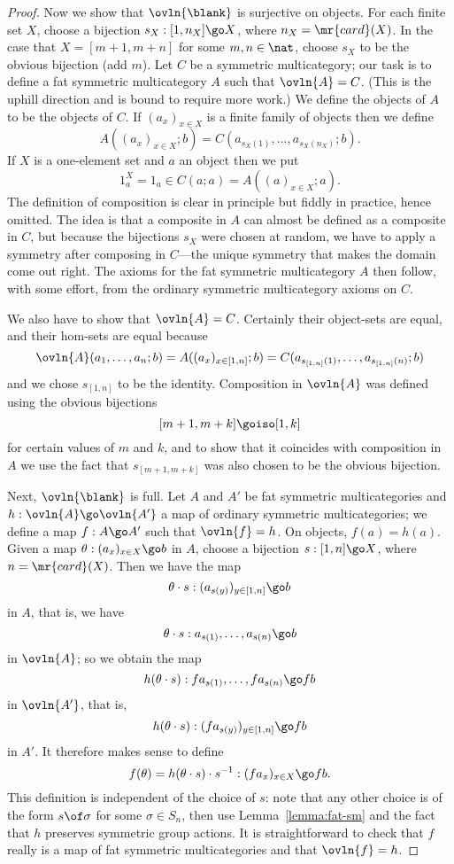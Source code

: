 \begin{proof}
Now we show that $\ovln{\blank}$ is surjective on objects.  For each finite
set $X$, choose a bijection $s_X: [1,n_X] \go X$, where $n_X =
\mr{card}(X)$.  In the case that $X=[m+1,m+n]$ for some $m,n\in\nat$,
choose $s_X$ to be the obvious bijection (add $m$).  Let $C$ be a symmetric
multicategory; our task is to define a fat symmetric multicategory $A$ such
that $\ovln{A} = C$.  (This is the uphill direction and is bound to require
more work.)  We define the objects of $A$ to be the objects of $C$.  If
$(a_x)_{x\in X}$ is a finite family of objects then we define
\[
A((a_x)_{x\in X}; b)
=
C(a_{s_X(1)}, \ldots, a_{s_X(n_X)}; b).
\]
If $X$ is a one-element set and $a$ an object then we put
\[
1_a^X = 1_a \in C(a;a) = A((a)_{x\in X}; a).
\]
The definition of composition is clear in principle but fiddly in practice,
hence omitted.  The idea is that a composite in $A$ can almost be defined
as a composite in $C$, but because the bijections $s_X$ were chosen at
random, we have to apply a symmetry after composing in $C$---the unique
symmetry that makes the domain come out right.  The axioms for the fat
symmetric multicategory $A$ then follow, with some effort, from the
ordinary symmetric multicategory axioms on $C$.

We also have to show that $\ovln{A} = C$.  Certainly their object-sets are
equal, and their hom-sets are equal because
\[
\ovln{A}(a_1, \ldots, a_n; b)
=
A((a_x)_{x\in [1,n]}; b)
=
C(a_{s_{[1,n]}(1)}, \ldots, a_{s_{[1,n]}(n)}; b)
\]
and we chose $s_{[1,n]}$ to be the identity.  Composition in $\ovln{A}$ was
defined using the obvious bijections
\[
[m+1, m+k] \goiso [1,k]
\]
for certain values of $m$ and $k$, and to show that it coincides with
composition in $A$ we use the fact that $s_{[m+1,m+k]}$ was also chosen to
be the obvious bijection.

Next, $\ovln{\blank}$ is full.  Let $A$ and $A'$ be fat symmetric
multicategories and $h: \ovln{A} \go \ovln{A'}$ a map of ordinary symmetric
multicategories; we define a map $f: A \go A'$ such that $\ovln{f} = h$.
On objects, $f(a) = h(a)$.  Given a map 
$
\theta: (a_x)_{x\in X} \go b
$
in $A$, choose a bijection $s: [1,n] \go X$, where $n=\mr{card}(X)$.  Then
we have the map
\[
\theta\cdot s: (a_{s(y)})_{y\in [1,n]} \go b
\]
in $A$, that is, we have 
\[
\theta\cdot s: a_{s(1)}, \ldots, a_{s(n)} \go b
\]
in $\ovln{A}$; so we obtain the map
\[
h(\theta\cdot s): fa_{s(1)}, \ldots, fa_{s(n)} \go fb
\]
in $\ovln{A'}$, that is, 
\[
h(\theta\cdot s): (fa_{s(y)})_{y\in [1,n]} \go fb
\]
in $A'$.  It therefore makes sense to define
\[
f(\theta) = h(\theta\cdot s) \cdot s^{-1}: (fa_x)_{x\in X} \go fb.
\]
This definition is independent of the choice of $s$: note that any other
choice is of the form $s\of \sigma$ for some $\sigma\in S_n$, then use
Lemma~\ref{lemma:fat-sm} and the fact that $h$ preserves symmetric group
actions.  It is straightforward to check that $f$ really is a map of fat
symmetric multicategories and that $\ovln{f} = h$.  


\end{proof}
